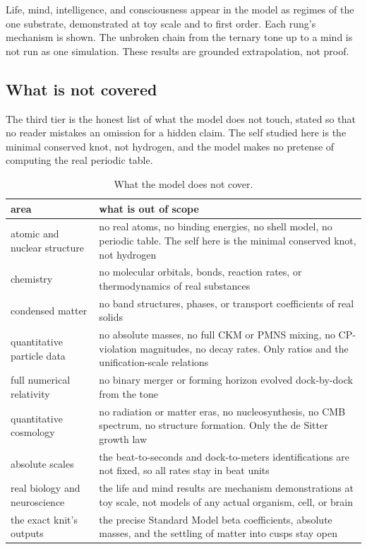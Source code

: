 \begin{principle}
Life, mind, intelligence, and consciousness appear in the model as regimes of the one substrate, demonstrated at toy scale and to first order. Each rung's mechanism is shown. The unbroken chain from the ternary tone up to a mind is not run as one simulation. These results are grounded extrapolation, not proof.
\end{principle}

\subsection{What is not covered}

The third tier is the honest list of what the model does not touch, stated so that no reader mistakes an omission for a hidden claim. The self studied here is the minimal conserved knot, not hydrogen, and the model makes no pretense of computing the real periodic table.

\begin{table}[ht]
\centering
\begin{tabular}{@{}p{}p{}@{}}
\toprule
area & what is out of scope \\
\midrule
atomic and nuclear structure & no real atoms, no binding energies, no shell model, no periodic table. The self here is the minimal conserved knot, not hydrogen \\
chemistry & no molecular orbitals, bonds, reaction rates, or thermodynamics of real substances \\
condensed matter & no band structures, phases, or transport coefficients of real solids \\
quantitative particle data & no absolute masses, no full CKM or PMNS mixing, no CP-violation magnitudes, no decay rates. Only ratios and the unification-scale relations \\
full numerical relativity & no binary merger or forming horizon evolved dock-by-dock from the tone \\
quantitative cosmology & no radiation or matter eras, no nucleosynthesis, no CMB spectrum, no structure formation. Only the de Sitter growth law \\
absolute scales & the beat-to-seconds and dock-to-meters identifications are not fixed, so all rates stay in beat units \\
real biology and neuroscience & the life and mind results are mechanism demonstrations at toy scale, not models of any actual organism, cell, or brain \\
the exact knit's outputs & the precise Standard Model beta coefficients, absolute masses, and the settling of matter into cusps stay open \\
\bottomrule
\end{tabular}
\caption{What the model does not cover.}
\label{tab:out-of-scope}
\end{table}

